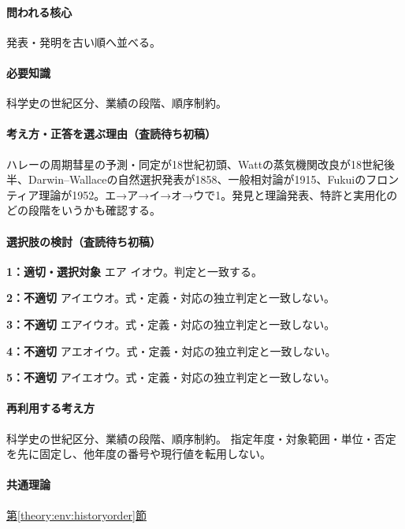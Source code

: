 \paragraph{問われる核心} 発表・発明を古い順へ並べる。

\paragraph{必要知識} 科学史の世紀区分、業績の段階、順序制約。

\paragraph{考え方・正答を選ぶ理由（査読待ち初稿）} ハレーの周期彗星の予測・同定が18世紀初頭、Wattの蒸気機関改良が18世紀後半、Darwin–Wallaceの自然選択発表が1858、一般相対論が1915、Fukuiのフロンティア理論が1952。エ→ア→イ→オ→ウで1。発見と理論発表、特許と実用化のどの段階をいうかも確認する。

\paragraph{選択肢の検討（査読待ち初稿）}\mbox{}\par

\noindent\textbf{1：適切・選択対象} エア イオウ。判定と一致する。\par

\noindent\textbf{2：不適切} アイエウオ。式・定義・対応の独立判定と一致しない。\par

\noindent\textbf{3：不適切} エアイウオ。式・定義・対応の独立判定と一致しない。\par

\noindent\textbf{4：不適切} アエオイウ。式・定義・対応の独立判定と一致しない。\par

\noindent\textbf{5：不適切} アイエオウ。式・定義・対応の独立判定と一致しない。\par

\paragraph{再利用する考え方} 科学史の世紀区分、業績の段階、順序制約。 指定年度・対象範囲・単位・否定を先に固定し、他年度の番号や現行値を転用しない。

\paragraph{共通理論} \hyperref[theory:env:historyorder]{第\ref*{theory:env:historyorder}節}


